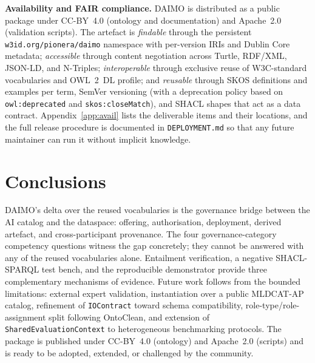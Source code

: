 \documentclass[Afour,sagev,times]{sagej}
\newcommand{\code}[1]{\texttt{#1}}
\begin{document}
\medskip
\noindent\textbf{Availability and FAIR compliance.}\label{sec:avail}
DAIMO is distributed as a public package under CC-BY~4.0 (ontology and documentation) and Apache~2.0 (validation scripts). The artefact is \emph{findable} through the persistent \code{w3id.org/pionera/daimo} namespace with per-version IRIs and Dublin Core metadata; \emph{accessible} through content negotiation across Turtle, RDF/XML, JSON-LD, and N-Triples; \emph{interoperable} through exclusive reuse of W3C-standard vocabularies and OWL~2~DL profile; and \emph{reusable} through SKOS definitions and examples per term, SemVer versioning (with a deprecation policy based on \code{owl:deprecated} and \code{skos:closeMatch}), and SHACL shapes that act as a data contract. Appendix~\ref{app:avail} lists the deliverable items and their locations, and the full release procedure is documented in \code{DEPLOYMENT.md} so that any future maintainer can run it without implicit knowledge.

\section{Conclusions}\label{sec:conclusion}

DAIMO's delta over the reused vocabularies is the governance bridge between the AI catalog and the dataspace: offering, authorisation, deployment, derived artefact, and cross-participant provenance. The four governance-category competency questions witness the gap concretely; they cannot be answered with any of the reused vocabularies alone. Entailment verification, a negative SHACL-SPARQL test bench, and the reproducible demonstrator provide three complementary mechanisms of evidence. Future work follows from the bounded limitations: external expert validation, instantiation over a public MLDCAT-AP catalog, refinement of \code{IOContract} toward schema compatibility, role-type/role-assignment split following OntoClean, and extension of \code{SharedEvaluationContext} to heterogeneous benchmarking protocols. The package is published under CC-BY~4.0 (ontology) and Apache~2.0 (scripts) and is ready to be adopted, extended, or challenged by the community.
\end{document}
